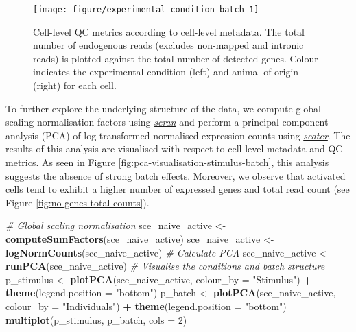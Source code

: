 \documentclass[9pt,a4paper,]{extarticle}
\newenvironment{Shaded}{\begin{snugshade}}{\end{snugshade}}
\newcommand{\CommentTok}[1]{\textcolor[rgb]{0.56,0.35,0.01}{\textit{#1}}}
\newcommand{\DataTypeTok}[1]{\textcolor[rgb]{0.13,0.29,0.53}{#1}}
\newcommand{\DecValTok}[1]{\textcolor[rgb]{0.00,0.00,0.81}{#1}}
\newcommand{\KeywordTok}[1]{\textcolor[rgb]{0.13,0.29,0.53}{\textbf{#1}}}
\newcommand{\NormalTok}[1]{#1}
\newcommand{\OperatorTok}[1]{\textcolor[rgb]{0.81,0.36,0.00}{\textbf{#1}}}
\newcommand{\StringTok}[1]{\textcolor[rgb]{0.31,0.60,0.02}{#1}}
\begin{document}
\begin{figure}

{\centering \texttt{[image: figure/experimental-condition-batch-1]} 

}

\caption{Cell-level QC metrics according to cell-level metadata. The total number of endogenous reads (excludes non-mapped and intronic reads) is plotted against the total number of detected genes. Colour indicates the experimental condition (left) and animal of origin (right) for each cell.}\label{fig:experimental-condition-batch}
\end{figure}

To further explore the underlying structure of the data, we compute global
scaling normalisation factors using \emph{\href{https://bioconductor.org/packages/3.11/scran}{scran}} and perform a
principal component analysis (PCA) of log-transformed normalised expression
counts using \emph{\href{https://bioconductor.org/packages/3.11/scater}{scater}}.
The results of this analysis are visualised with respect to cell-level metadata
and QC metrics.
As seen in Figure \ref{fig:pca-visualisation-stimulus-batch}, this analysis
suggests the absence of strong batch effects. Moreover, we observe that
activated cells tend to exhibit a higher number of expressed genes and total
read count (see Figure \ref{fig:no-genes-total-counts}).

\begin{Shaded}
\begin{Highlighting}[]
\CommentTok{# Global scaling normalisation}
\NormalTok{sce_naive_active <-}\StringTok{ }\KeywordTok{computeSumFactors}\NormalTok{(sce_naive_active)}
\NormalTok{sce_naive_active <-}\StringTok{ }\KeywordTok{logNormCounts}\NormalTok{(sce_naive_active)}
\CommentTok{# Calculate PCA}
\NormalTok{sce_naive_active <-}\StringTok{ }\KeywordTok{runPCA}\NormalTok{(sce_naive_active)}
\CommentTok{# Visualise the conditions and batch structure}
\NormalTok{p_stimulus <-}\StringTok{ }\KeywordTok{plotPCA}\NormalTok{(sce_naive_active, }\DataTypeTok{colour_by =} \StringTok{"Stimulus"}\NormalTok{) }\OperatorTok{+}
\StringTok{  }\KeywordTok{theme}\NormalTok{(}\DataTypeTok{legend.position =} \StringTok{"bottom"}\NormalTok{)}
\NormalTok{p_batch <-}\StringTok{ }\KeywordTok{plotPCA}\NormalTok{(sce_naive_active, }\DataTypeTok{colour_by =} \StringTok{"Individuals"}\NormalTok{) }\OperatorTok{+}
\StringTok{  }\KeywordTok{theme}\NormalTok{(}\DataTypeTok{legend.position =} \StringTok{"bottom"}\NormalTok{)}
\KeywordTok{multiplot}\NormalTok{(p_stimulus, p_batch, }\DataTypeTok{cols =} \DecValTok{2}\NormalTok{)}
\end{Highlighting}
\end{Shaded}
\end{document}
